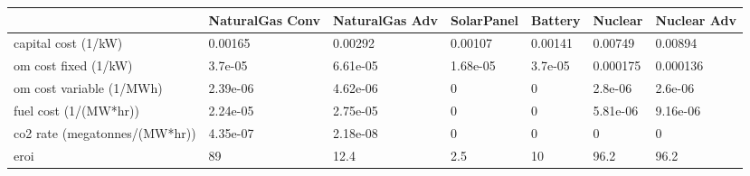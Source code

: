\begin{tabular}{lllllll}
\toprule
 & NaturalGas Conv & NaturalGas Adv & SolarPanel & Battery & Nuclear & Nuclear Adv \\
\midrule
capital cost (1/kW) & 0.00165 & 0.00292 & 0.00107 & 0.00141 & 0.00749 & 0.00894 \\
om cost fixed (1/kW) & 3.7e-05 & 6.61e-05 & 1.68e-05 & 3.7e-05 & 0.000175 & 0.000136 \\
om cost variable (1/MWh) & 2.39e-06 & 4.62e-06 & 0 & 0 & 2.8e-06 & 2.6e-06 \\
fuel cost (1/(MW*hr)) & 2.24e-05 & 2.75e-05 & 0 & 0 & 5.81e-06 & 9.16e-06 \\
co2 rate (megatonnes/(MW*hr)) & 4.35e-07 & 2.18e-08 & 0 & 0 & 0 & 0 \\
eroi & 89 & 12.4 & 2.5 & 10 & 96.2 & 96.2 \\
\bottomrule
\end{tabular}
